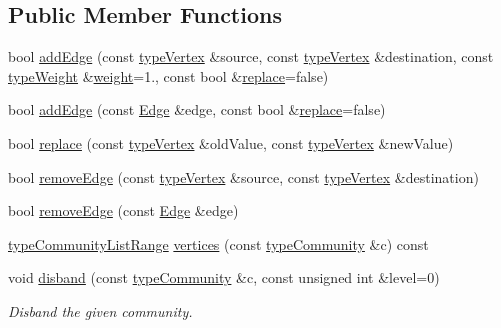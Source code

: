\subsection*{Public Member Functions}
\begin{DoxyCompactItemize}
\item 
bool \hyperlink{classGraphUndirectedGroupable_a8c010517bff903a50807e6e8ad8cc6db}{add\+Edge} (const \hyperlink{edge_8h_a5fbd20c46956d479cb10afc9855223f6}{type\+Vertex} \&source, const \hyperlink{edge_8h_a5fbd20c46956d479cb10afc9855223f6}{type\+Vertex} \&destination, const \hyperlink{edge_8h_a2e7ea3be891ac8b52f749ec73fee6dd2}{type\+Weight} \&\hyperlink{classGraphUndirected_ae40d431c92d8b4884c7915c44d42f356}{weight}=1., const bool \&\hyperlink{classGraphUndirectedGroupable_ad2685678f448028f17c7627634659f7c}{replace}=false)
\item 
bool \hyperlink{classGraphUndirectedGroupable_a2efe963916349ac6615721ab85a93ceb}{add\+Edge} (const \hyperlink{classEdge}{Edge} \&edge, const bool \&\hyperlink{classGraphUndirectedGroupable_ad2685678f448028f17c7627634659f7c}{replace}=false)
\item 
bool \hyperlink{classGraphUndirectedGroupable_a164600ca9727676ad7b370b9061927d4}{replace} (const \hyperlink{edge_8h_a5fbd20c46956d479cb10afc9855223f6}{type\+Vertex} \&old\+Value, const \hyperlink{edge_8h_a5fbd20c46956d479cb10afc9855223f6}{type\+Vertex} \&new\+Value)
\item 
bool \hyperlink{classGraphUndirectedGroupable_ad1a488cc292d7e63d289f598aeaaacd6}{remove\+Edge} (const \hyperlink{edge_8h_a5fbd20c46956d479cb10afc9855223f6}{type\+Vertex} \&source, const \hyperlink{edge_8h_a5fbd20c46956d479cb10afc9855223f6}{type\+Vertex} \&destination)
\item 
bool \hyperlink{classGraphUndirectedGroupable_a88e02e4e05f304b289558922f1cb6aa1}{remove\+Edge} (const \hyperlink{classEdge}{Edge} \&edge)
\item 
\hyperlink{graphUndirectedGroupable_8h_ad440de7f8b59665f0705cc6f745aab09}{type\+Community\+List\+Range} \hyperlink{classGraphUndirectedGroupable_aaa5e7db5ba0b5b87ed6af50ef958b9d7}{vertices} (const \hyperlink{graphUndirectedGroupable_8h_a914da95c9ea7f14f4b7f875c36818556}{type\+Community} \&c) const
\item 
void \hyperlink{classGraphUndirectedGroupable_ac82f4c93994c372d05a660b36cdce8f3}{disband} (const \hyperlink{graphUndirectedGroupable_8h_a914da95c9ea7f14f4b7f875c36818556}{type\+Community} \&c, const unsigned int \&level=0)
\begin{DoxyCompactList}\small\item\em Disband the given community. \end{DoxyCompactList}\item 

\end{DoxyCompactItemize}
